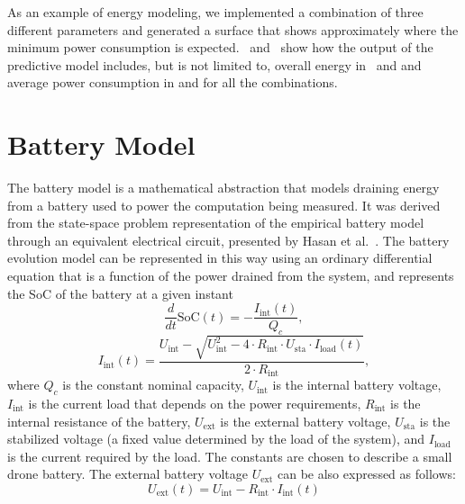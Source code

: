 As an example of energy modeling, we implemented a combination of three different parameters and generated a surface that shows approximately where the minimum power consumption is expected. ~and~ show how the output of the predictive model includes, but is not limited to, overall energy in~ and  and average power consumption in  and  for all the combinations. 

\section{\color{cyan}Battery Model}
\label{sec:battery-model}

The battery model is a mathematical abstraction that models draining energy from a battery used to power the computation being measured. It was derived from the state-space problem representation of the empirical battery model through an equivalent electrical circuit, presented by Hasan et al.~\cite{hasan2018exogenous}. The battery evolution model can be represented in this way using an ordinary differential equation that is a function of the power drained from the system, and represents the SoC of the battery at a given instant
\begin{equation}\label{eq:battery-model-1}
  \frac{d}{dt}\mathrm{SoC}(t)=-\frac{I_\mathrm{int}(t)}{Q_c},
\end{equation}
\begin{equation}\label{eq:battery-model-2}
  I_\mathrm{int}(t)=
    \frac{U_\mathrm{int}-
    \sqrt{
      U_\mathrm{int}^2-
      4\cdot R_{\mathrm{int}}\cdot U_\mathrm{sta}\cdot I_{\mathrm{load}}(t)}
    }{2\cdot R_\mathrm{int}},
\end{equation}
where $Q_c$ is the constant nominal capacity, $U_\mathrm{int}$ is the internal battery voltage, $I_\mathrm{int}$ is the current load that depends on the power requirements, $R_\mathrm{int}$ is the internal resistance of the battery, $U_\mathrm{ext}$ is the external battery voltage, $U_{\mathrm{sta}}$ is the stabilized voltage (a fixed value determined by the load of the system), and $I_\mathrm{load}$ is the current required by the load. The constants are chosen to describe a small drone battery. The external battery voltage $U_{\mathrm{ext}}$ can be also expressed as follows:
\begin{equation}
U_{\mathrm{ext}}(t)=U_{\mathrm{int}}-R_{\mathrm{int}}\cdot I_{\mathrm{int}}(t)
\end{equation}

